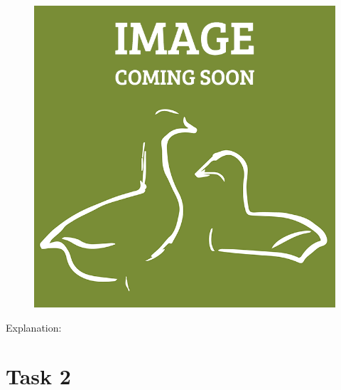 \documentclass[a4paper,11pt,oneside]{scrreprt}
\begin{document}
\begin{figure}[h]
	\centering
	\includegraphics[clip, trim=0cm 0cm 0cm 0cm, scale=0.25]{./images/redesign.png}
\end{figure}

	Explanation:\\
	

\bigskip


%

\clearpage

\section*{Task 2}
\end{document}
